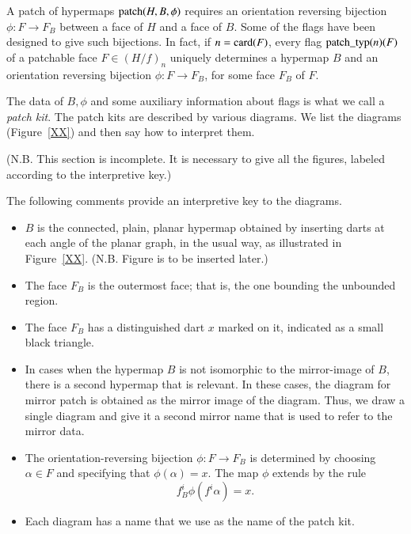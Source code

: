 A patch of hypermaps ${\operatorname{patch}}(H,B,\phi)$ requires an
orientation reversing bijection $\phi:F\to F_B$ between a face of
$H$ and a face of $B$.  Some of the flags have been designed to
give such bijections.  In fact,  if $n={\operatorname{card}}(F)$, every flag
${\operatorname{patch\_typ}}(n)(F)$ of a patchable face $F\in (H/f)_{n}$
uniquely determines a hypermap $B$ and an orientation reversing
bijection $\phi:F\to F_B$, for some face $F_B$ of $F$.

The data of $B,\phi$ and some auxiliary information about flags is
what we call a {\it patch kit}.  The patch kits are described by
various diagrams.  We list the diagrams (Figure~\ref{XX}) and then
say how to interpret them.

(N.B. This section is incomplete.  It is necessary to give all the
figures, labeled according to the interpretive key.)  %

The following comments provide an interpretive key to the
diagrams.
\begin{itemize}
    \item $B$ is the connected, plain, planar
    hypermap obtained by inserting darts at each angle of the
    planar graph, in the usual way, as illustrated in
    Figure~\ref{XX}. %
    (N.B. Figure is to be inserted later.) %
    \item The face $F_B$ is the outermost face; that is, the one
    bounding the unbounded region.
    \item The face $F_B$ has a distinguished dart $x$ marked on it,
    indicated as a small black triangle.
    \item In cases when the hypermap $B$ is not isomorphic to the
    mirror-image of $B$, there is a second hypermap that is
    relevant. In these cases, the diagram for mirror patch is obtained as the
    mirror image of the diagram.  Thus, we draw a single diagram
    and give it a second mirror name that is used to refer to the
    mirror data.
    \item The orientation-reversing bijection $\phi:F\to F_B$ is
    determined by choosing $\alpha\in F$ and specifying that
    $\phi(\alpha) =x$.  The map $\phi$ extends by the rule
        $$f_B^i\phi(f^i\alpha ) = x.$$
    \item Each diagram has a name that we use as the name of the patch kit.
\end{itemize}

